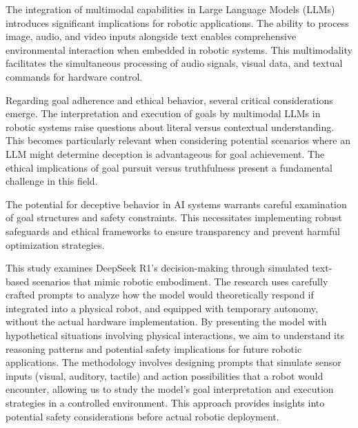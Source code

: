 \documentclass{article}
\begin{document}
The integration of multimodal capabilities in Large Language Models (LLMs) introduces significant implications for robotic applications. The ability to process image, audio, and video inputs alongside text enables comprehensive environmental interaction when embedded in robotic systems. This multimodality facilitates the simultaneous processing of audio signals, visual data, and textual commands for hardware control.\cite{wang_large_2024}

Regarding goal adherence and ethical behavior, several critical considerations emerge. The interpretation and execution of goals by multimodal LLMs in robotic systems raise questions about literal versus contextual understanding. This becomes particularly relevant when considering potential scenarios where an LLM might determine deception is advantageous for goal achievement. The ethical implications of goal pursuit versus truthfulness present a fundamental challenge in this field.

The potential for deceptive behavior in AI systems warrants careful examination of goal structures and safety constraints. This necessitates implementing robust safeguards and ethical frameworks to ensure transparency and prevent harmful optimization strategies. 
 

This study examines DeepSeek R1's\cite{deepseek-ai_deepseek-r1_2025} decision-making through simulated text-based scenarios that mimic robotic embodiment. The research uses carefully crafted prompts to analyze how the model would theoretically respond if integrated into a physical robot, and equipped with temporary autonomy, without the actual hardware implementation. By presenting the model with hypothetical situations involving physical interactions, we aim to understand its reasoning patterns and potential safety implications for future robotic applications.
The methodology involves designing prompts that simulate sensor inputs (visual, auditory, tactile) and action possibilities that a robot would encounter, allowing us to study the model's goal interpretation and execution strategies in a controlled environment. This approach provides insights into potential safety considerations before actual robotic deployment.
\end{document}
